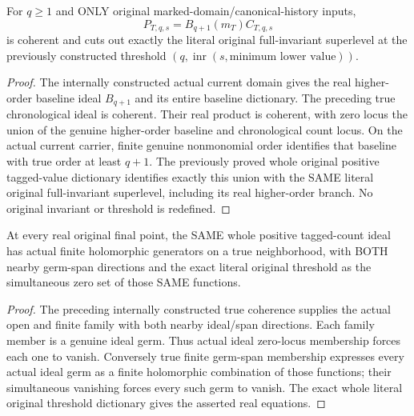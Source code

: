 \begin{theorem}
\label{hir:original-positive-tagged-companion-count-coherent-ideal}
\leanok
{}
For $q\geq1$ and ONLY original marked-domain/canonical-history inputs,
\[
 P_{T,q,s}=B_{q+1}(m_T)C_{T,q,s}
\]
is coherent and cuts out exactly the literal original full-invariant
superlevel at the previously constructed threshold
$(q,\operatorname{inr}(s,\text{minimum lower value}))$.
\end{theorem}
\begin{proof}
The internally constructed actual current domain gives the real higher-order
baseline ideal $B_{q+1}$ and its entire baseline dictionary. The preceding
true chronological ideal is coherent. Their real product is coherent, with
zero locus the union of the genuine higher-order baseline and chronological
count locus. On the actual current carrier, finite genuine nonmonomial order
identifies that baseline with true order at least $q+1$. The previously proved
whole original positive tagged-value dictionary identifies exactly this union
with the SAME literal original full-invariant superlevel, including its real
higher-order branch. No original invariant or threshold is redefined.
\end{proof}

\begin{theorem}
\label{hir:original-positive-tagged-companion-count-local-generators}
\leanok
{}
At every real original final point, the SAME whole positive tagged-count
ideal has actual finite holomorphic generators on a true neighborhood, with
BOTH nearby germ-span directions and the exact literal original threshold as
the simultaneous zero set of those SAME functions.
\end{theorem}
\begin{proof}
The preceding internally constructed true coherence supplies the actual open
and finite family with both nearby ideal/span directions. Each family member
is a genuine ideal germ. Thus actual ideal zero-locus membership forces each
one to vanish. Conversely true finite germ-span membership expresses every
actual ideal germ as a finite holomorphic combination of those functions;
their simultaneous vanishing forces every such germ to vanish. The exact
whole literal original threshold dictionary gives the asserted real equations.
\end{proof}

